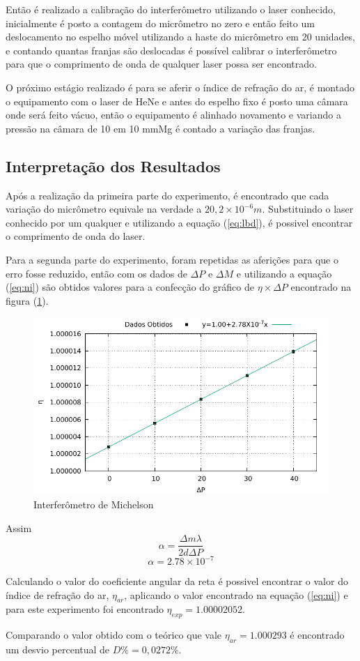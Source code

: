 Então é realizado a calibração do interferômetro utilizando o laser conhecido, inicialmente é posto a contagem do micrômetro no zero e então feito um deslocamento no espelho móvel utilizando a haste do micrômetro em 20 unidades, e contando quantas franjas são deslocadas é possível calibrar o interferômetro para que o comprimento de onda de qualquer laser possa ser encontrado.

O próximo estágio realizado é para se aferir o índice de refração do ar, é montado o equipamento com o laser de HeNe e antes do espelho fixo é posto uma câmara onde será feito vácuo, então o equipamento é alinhado novamento e variando a pressão na câmara de 10 em 10 mmMg é contado a variação das franjas. 	 
\subsection{Interpretação dos Resultados}
Após a realização da primeira parte do experimento, é encontrado que  cada variação do micrômetro equivale na verdade a $20,2 \times 10^{-6} m$. Substituindo o laser conhecido por um qualquer e utilizando a equação (\ref{eq:lbd}), é possivel encontrar o comprimento de onda do laser.

Para a segunda parte do experimento, foram repetidas as aferições para que o erro fosse reduzido, então com os dados de $\Delta P$ e $\Delta M$ e utilizando a equação (\ref{eq:ni}) são obtidos valores para a confecção do gráfico de $\eta \times \Delta P$ encontrado na figura (\ref{im:aa}).

 \begin{figure}[!h]
 	\centering
 		\includegraphics[scale= 1]{grafico/ar.pdf}
 	\caption{Interferômetro de Michelson}
 	\label{im:aa}
 \end{figure}

Assim 
\begin{equation*}
\alpha = \frac{\Delta m\lambda}{2d\Delta P}
\end{equation*}
\begin{equation*}
\alpha = 2.78\times 10^{-7}
\end{equation*}

Calculando o valor do coeficiente angular da reta é possivel encontrar o valor do índice de refração do ar, $\eta_{ar}$, aplicando o valor encontrado na equação (\ref{eq:ni}) e para este experimento foi encontrado $\eta_{exp} = 1.00002052$.

Comparando o valor obtido com o teórico que vale $\eta_{ar} = 1.000293$ é encontrado um desvio percentual de $D\% = 0,0272\%$.

